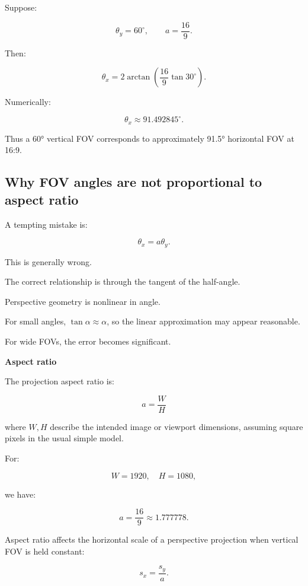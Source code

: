 \hypertarget{02-foundations-ii-ch033-numerical-example-v11.04.05}{}

Suppose:

\[
 \theta_y=60^\circ, \qquad a=\frac{16}{9}.
\]

Then:

\[
 \theta_x= 2\arctan \left( \frac{16}{9}\tan30^\circ \right).
\]

Numerically:

\[
 \boxed{ \theta_x\approx91.492845^\circ }.
\]

Thus a 60° vertical FOV corresponds to approximately 91.5° horizontal FOV at 16:9.

\subsection{Why FOV angles are not proportional to aspect ratio}\label{02-foundations-ii-ch033-why-fov-angles-are-not-proportional-to-aspect-ratio}

\hypertarget{02-foundations-ii-ch033-why-fov-angles-are-not-proportional-to-aspect-ratio}{}

A tempting mistake is:

\[
 \theta_x=a\theta_y.
\]

This is generally wrong.

The correct relationship is through the tangent of the half-angle.

Perspective geometry is nonlinear in angle.

For small angles, \(\tan\alpha\approx\alpha\), so the linear approximation may appear reasonable.

For wide FOVs, the error becomes significant.

\textbf{Aspect ratio}

The projection aspect ratio is:

\[
 \boxed{ a=\frac WH }
\]

where \(W,H\) describe the intended image or viewport dimensions, assuming square pixels in the usual simple model.

For:

\[
 W=1920,\quad H=1080,
\]

we have:

\[
 \boxed{ a=\frac{16}{9}\approx1.777778 }.
\]

Aspect ratio affects the horizontal scale of a perspective projection when vertical FOV is held constant:

\[
 s_x=\frac{s_y}{a}.
\]

